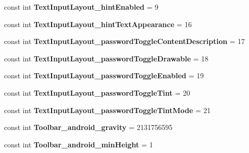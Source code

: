 \begin{DoxyCompactItemize}
const int {\bfseries Text\+Input\+Layout\+\_\+hint\+Enabled} = 9
\item 
\mbox{\label{classst_delivery_1_1_resource_1_1_styleable_ab1e7ad450be2d434efb503d02783d2e1}} 
const int {\bfseries Text\+Input\+Layout\+\_\+hint\+Text\+Appearance} = 16
\item 
\mbox{\label{classst_delivery_1_1_resource_1_1_styleable_a870028180d39ebcdd5dd7d60a42f4b09}} 
const int {\bfseries Text\+Input\+Layout\+\_\+password\+Toggle\+Content\+Description} = 17
\item 
\mbox{\label{classst_delivery_1_1_resource_1_1_styleable_abf29d8edaa900e7a6105254d011e2d93}} 
const int {\bfseries Text\+Input\+Layout\+\_\+password\+Toggle\+Drawable} = 18
\item 
\mbox{\label{classst_delivery_1_1_resource_1_1_styleable_a0898061446848a2d2102234ab983bebb}} 
const int {\bfseries Text\+Input\+Layout\+\_\+password\+Toggle\+Enabled} = 19
\item 
\mbox{\label{classst_delivery_1_1_resource_1_1_styleable_aae5f8f835cf0e610cd4ffb0abb4063e9}} 
const int {\bfseries Text\+Input\+Layout\+\_\+password\+Toggle\+Tint} = 20
\item 
\mbox{\label{classst_delivery_1_1_resource_1_1_styleable_a2547eb43bed15df960b89b443a06c87f}} 
const int {\bfseries Text\+Input\+Layout\+\_\+password\+Toggle\+Tint\+Mode} = 21
\item 
\mbox{\label{classst_delivery_1_1_resource_1_1_styleable_ac8c4fd707a19f0aa7866242dbaa9b09d}} 
const int {\bfseries Toolbar\+\_\+android\+\_\+gravity} = 2131756595
\item 
\mbox{\label{classst_delivery_1_1_resource_1_1_styleable_a50e6e66181d31b6e843cd123b2df8f38}} 
const int {\bfseries Toolbar\+\_\+android\+\_\+min\+Height} = 1
\item 
\mbox{\label{classst_delivery_1_1_resource_1_1_styleable_a1e18f33ae18876823115fa0e8f5fd1cb}} 

\end{DoxyCompactItemize}
